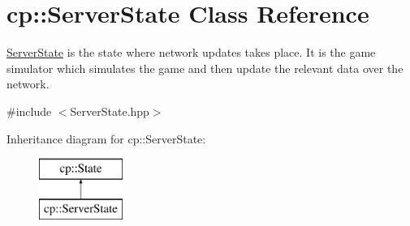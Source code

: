 \hypertarget{classcp_1_1_server_state}{}\section{cp\+:\+:Server\+State Class Reference}
\label{classcp_1_1_server_state}


\hyperlink{classcp_1_1_server_state}{Server\+State} is the state where network updates takes place. It is the game simulator which simulates the game and then update the relevant data over the network.  




{\ttfamily \#include $<$Server\+State.\+hpp$>$}

Inheritance diagram for cp\+:\+:Server\+State\+:\begin{figure}[H]
\begin{center}
\leavevmode
\includegraphics[height=2.000000cm]{classcp_1_1_server_state}
\end{center}
\end{figure}
